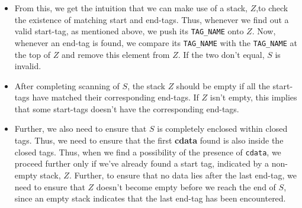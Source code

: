 \begin{itemize}
\item From this, we get the intuition that we can make use of a stack, $Z$,to check the existence of matching start and end-tags. Thus, whenever we find out a valid start-tag, as mentioned above, we push its \texttt{TAG\_NAME} onto $Z$. Now, whenever an end-tag is found, we compare its \texttt{TAG\_NAME} with the \texttt{TAG\_NAME} at the top of $Z$ and remove this element from $Z$. If the two don't equal, $S$ is invalid.

\item After completing scanning of $S$, the stack $Z$ should be empty if all the start-tags have matched their corresponding end-tags. If $Z$ isn't empty, this implies that some start-tags doesn't have the corresponding end-tags.

\item Further, we also need to ensure that $S$ is completely enclosed within closed tags. Thus, we need to ensure that the first \textbf{cdata} found is also inside the closed tags. Thus, when we find a possibility of the presence of \texttt{cdata}, we proceed further only if we've already found a start tag, indicated by a non-empty stack, $Z$. Further, to ensure that no data lies after the last end-tag, we need to ensure that $Z$ doesn't become empty before we reach the end of $S$, since an empty stack indicates that the last end-tag has been encountered.
\end{itemize}

